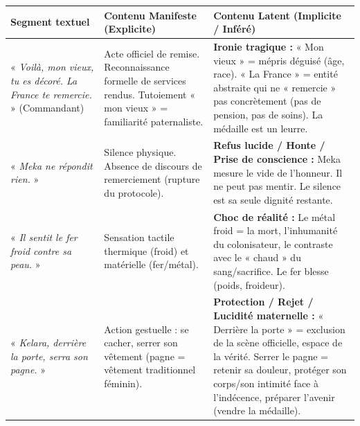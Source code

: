 \documentclass[11pt]{article}
\begin{document}
\begin{exoresolu}
\begin{center}
\begin{tabularx}{\linewidth}{|l|X|X|}\hline
\textbf{Segment textuel} & \textbf{Contenu Manifeste (Explicite)} & \textbf{Contenu Latent (Implicite / Inféré)} \\ \hline
« \emph{Voilà, mon vieux, tu es décoré. La France te remercie.} » (Commandant) & Acte officiel de remise. Reconnaissance formelle de services rendus. Tutoiement « mon vieux » = familiarité paternaliste. & \textbf{Ironie tragique :} « Mon vieux » = mépris déguisé (âge, race). « La France » = entité abstraite qui ne « remercie » pas concrètement (pas de pension, pas de soins). La médaille est un leurre. \\ \hline
« \emph{Meka ne répondit rien.} » & Silence physique. Absence de discours de remerciement (rupture du protocole). & \textbf{Refus lucide / Honte / Prise de conscience :} Meka mesure le vide de l'honneur. Il ne peut pas mentir. Le silence est sa seule dignité restante. \\ \hline
« \emph{Il sentit le fer froid contre sa peau.} » & Sensation tactile thermique (froid) et matérielle (fer/métal). & \textbf{Choc de réalité :} Le métal froid = la mort, l'inhumanité du colonisateur, le contraste avec le « chaud » du sang/sacrifice. Le fer blesse (poids, froideur). \\ \hline
« \emph{Kelara, derrière la porte, serra son pagne.} » & Action gestuelle : se cacher, serrer son vêtement (pagne = vêtement traditionnel féminin). & \textbf{Protection / Rejet / Lucidité maternelle :} « Derrière la porte » = exclusion de la scène officielle, espace de la vérité. Serrer le pagne = retenir sa douleur, protéger son corps/son intimité face à l'indécence, préparer l'avenir (vendre la médaille). \\ \hline
\end{tabularx}
\end{center}


\end{exoresolu}
\end{document}
